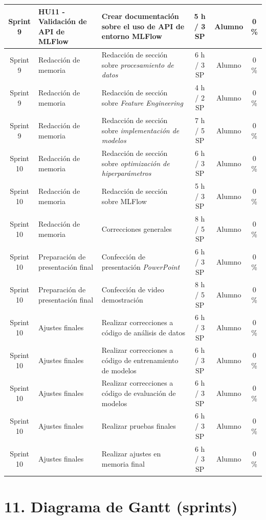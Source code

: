 \documentclass[
11pt, %
]{charter}
\begin{document}
\begin{xltabular}{\linewidth}{@{}|c|X|X|c|c|c|@{}}
Sprint 9 & HU11 - Validación de API de MLFlow & Crear documentación sobre el uso de API de entorno MLFlow  & 5 h / 3 SP & Alumno & 0 \% \\ \hline
Sprint 9 & Redacción de memoria  & Redacción de sección sobre \textit{procesamiento de datos}  & 6 h / 3 SP & Alumno & 0 \% \\ \hline
Sprint 9 & Redacción de memoria  & Redacción de sección sobre \textit{Feature Engineering}  & 4 h / 2 SP & Alumno & 0 \% \\ \hline
Sprint 9 & Redacción de memoria  & Redacción de sección sobre \textit{implementación de modelos}  & 7 h / 5 SP & Alumno & 0 \% \\ \hline
Sprint 10 & Redacción de memoria  & Redacción de sección sobre \textit{optimización de hiperparámetros}  & 6 h / 3 SP & Alumno & 0 \% \\ \hline
Sprint 10 & Redacción de memoria  & Redacción de sección sobre MLFlow  & 5 h / 3 SP & Alumno & 0 \% \\ \hline
Sprint 10 & Redacción de memoria  & Correcciones generales  & 8 h / 5 SP & Alumno & 0 \% \\ \hline
Sprint 10 & Preparación de presentación final  & Confección de presentación \textit{PowerPoint}  & 6 h / 3 SP & Alumno & 0 \%\\ \hline
Sprint 10 & Preparación de presentación final  & Confección de video demostración  & 8 h / 5 SP & Alumno & 0 \%\\ \hline
Sprint 10 & Ajustes finales & Realizar correcciones a código de análisis de datos & 6 h / 3 SP & Alumno & 0 \%\\ \hline
Sprint 10 & Ajustes finales & Realizar correcciones a código de entrenamiento de modelos & 6 h / 3 SP & Alumno & 0 \%\\ \hline
Sprint 10 & Ajustes finales & Realizar correcciones a código de evaluación de modelos & 6 h / 3 SP & Alumno & 0 \%\\ \hline
Sprint 10 & Ajustes finales & Realizar pruebas finales & 6 h / 3 SP & Alumno & 0 \%\\ \hline
Sprint 10 & Ajustes finales & Realizar ajustes en memoria final & 6 h / 3 SP & Alumno & 0 \%\\ \hline
\end{xltabular}

\section{11. Diagrama de Gantt (sprints)}
\label{sec:gantt}
\end{document}
